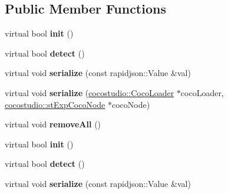 \subsection*{Public Member Functions}
\begin{DoxyCompactItemize}
\item 
\mbox{\label{classcocostudio_1_1BaseTriggerCondition_ae4de47d9e61e0ca7c5f4aa2316932344}} 
virtual bool {\bfseries init} ()
\item 
\mbox{\label{classcocostudio_1_1BaseTriggerCondition_ab97eb4adda7ecb162b3a4385ebd1d239}} 
virtual bool {\bfseries detect} ()
\item 
\mbox{\label{classcocostudio_1_1BaseTriggerCondition_aa274762a77027b42eff99a7bbdb06aa1}} 
virtual void {\bfseries serialize} (const rapidjson\+::\+Value \&val)
\item 
\mbox{\label{classcocostudio_1_1BaseTriggerCondition_a5feb92c558512869a5e4bf3749bbca7c}} 
virtual void {\bfseries serialize} (\hyperlink{classcocostudio_1_1CocoLoader}{cocostudio\+::\+Coco\+Loader} $\ast$coco\+Loader, \hyperlink{structcocostudio_1_1stExpCocoNode}{cocostudio\+::st\+Exp\+Coco\+Node} $\ast$coco\+Node)
\item 
\mbox{\label{classcocostudio_1_1BaseTriggerCondition_a4146c6bfb11846c211cb2425e4ec05cd}} 
virtual void {\bfseries remove\+All} ()
\item 
\mbox{\label{classcocostudio_1_1BaseTriggerCondition_a29f14aa57cb0abc9adb0e82258df8420}} 
virtual bool {\bfseries init} ()
\item 
\mbox{\label{classcocostudio_1_1BaseTriggerCondition_a3e55f704e8da1ee52d337cf7300972e0}} 
virtual bool {\bfseries detect} ()
\item 
\mbox{\label{classcocostudio_1_1BaseTriggerCondition_a435e0e5ba6c8fec22d30717370b46354}} 
virtual void {\bfseries serialize} (const rapidjson\+::\+Value \&val)

\end{DoxyCompactItemize}
